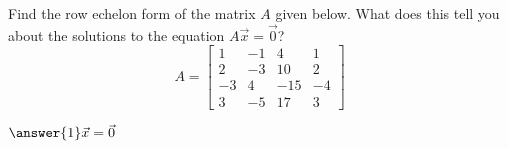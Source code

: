 \documentclass{ximera}
\begin{document}
\begin{exercise}
    Find the row echelon form of the matrix $A$ given below. What does this tell you about the solutions to the equation $A\vec{x} = \vec{0}$?
    \begin{equation*}
        A = 
        \begin{bmatrix} 
        1 & -1 & 4 & 1 \\ 
        2 & -3 & 10 & 2 \\ 
        -3 & 4 & -15 & -4 \\ 
        3 & -5 & 17 & 3 
        \end{bmatrix}
    \end{equation*}
    \begin{multipleChoice}
    \end{multipleChoice}
    \begin{problem}
        $\answer{1}\vec{x} = \vec{0}$
    \end{problem}
\end{exercise}
%
%
\end{document}
